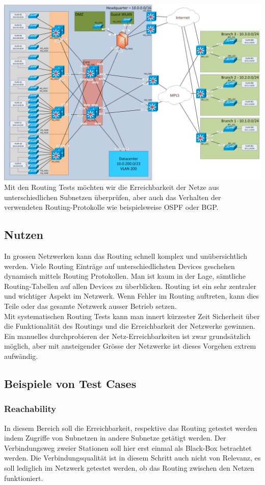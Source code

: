\documentclass[a4,12pt]{scrartcl}
\begin{document}
\includegraphics[width=1\textwidth]{figures/Netzwerk_logisch.png}\\

\noindent Mit den Routing Tests möchten wir die Erreichbarkeit der Netze aus unterschiedlichen Subnetzen überprüfen, aber auch das Verhalten der verwendeten Routing-Protokolle wie beispielsweise OSPF oder BGP. 
\subsection{Nutzen}
In grossen Netzwerken kann das Routing schnell komplex und unübersichtlich werden. Viele Routing Einträge auf unterschiedlichsten Devices geschehen dynamisch mittels Routing Protokollen. Man ist kaum in der Lage, sämtliche Routing-Tabellen auf allen Devices zu überblicken. Routing ist ein sehr zentraler und wichtiger Aspekt im Netzwerk. Wenn Fehler im Routing auftreten, kann dies Teile oder das gesamte Netzwerk ausser Betrieb setzen.\\

\noindent Mit systematischen Routing Tests kann man innert kürzester Zeit Sicherheit über die Funktionalität des Routings und die Erreichbarkeit der Netzwerke gewinnen. Ein manuelles durchprobieren der Netz-Erreichbarkeiten ist zwar grundsätzlich möglich, aber mit ansteigender Grösse der Netzwerke ist dieses Vorgehen extrem aufwändig. 
\subsection{Beispiele von Test Cases}
\subsubsection{Reachability}
In diesem Bereich soll die Erreichbarkeit, respektive das Routing getestet werden indem Zugriffe von Subnetzen in andere Subnetze getätigt werden. Der Verbindungsweg zweier Stationen soll hier erst einmal als Black-Box betrachtet werden. Die Verbindungsqualität ist in diesem Schritt auch nicht von Relevanz, es soll lediglich im Netzwerk getestet werden, ob das Routing zwischen den Netzen funktioniert.\\
\end{document}
